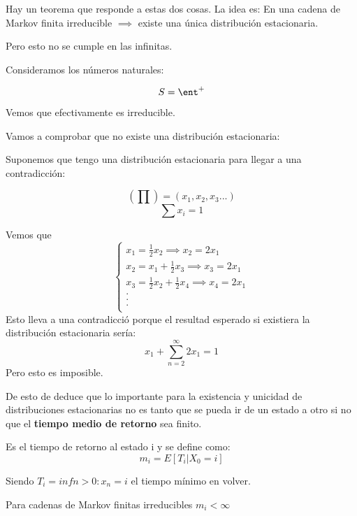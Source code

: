 Hay un teorema que responde a estas dos cosas.
La idea es:
	En una cadena de Markov finita irreducible $\implies$ existe una única distribución estacionaria.

	Pero esto no se cumple en las infinitas.
	\begin{example}
		Consideramos los números naturales:
		\begin{center}


		\end{center}
		$$S = \ent ^+$$
		Vemos que efectivamente es irreducible.

		Vamos a comprobar que no existe una distribución estacionaria:

		Suponemos que tengo una distribución estacionaria para llegar a una contradicción:

		$$(\prod) = (x_1, x_2, x_3...)$$
		$$\sum x_i = 1$$

		Vemos que
		$$
		\begin{cases}
		x_1 = \frac{1}{2} x_2 \implies x_2 = 2x_1\\
		x_2 = x_1 + \frac{1}{2} x_3 \implies x_3 = 2x_1\\
		x_3 = \frac{1}{2} x_2 + \frac{1}{2} x_4 \implies x_4 = 2x_1\\
		.\\
		.\\
		.\\
		\end{cases}$$
		Esto lleva a una contradicció porque el resultad esperado si existiera la distribución estacionaria sería:
		$$x_1 + \sum_{n=2}^{\infty} 2 x_1 =1$$
		Pero esto es imposible.
	\end{example}



	De esto de deduce que lo importante para la existencia y unicidad de distribuciones estacionarias no es tanto que se pueda ir de un estado a otro si no que el \textbf{tiempo medio de retorno} sea finito.

	\begin{defn}
		Es el tiempo de retorno al estado i y se define como:
		$$m_i = E[T_i|X_0 = i]$$

		Siendo $T_i = inf{n>0 : x_n = i}$ el tiempo mínimo en volver.
	\end{defn}

	\obs Para cadenas de Markov finitas irreducibles $m_i < \infty$

